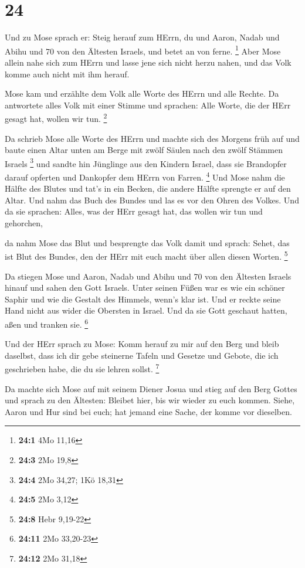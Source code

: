 \hypertarget{section-5}{%
\section{24}\label{section-5}}

 Und zu Mose sprach er: Steig herauf zum HErrn, du und
Aaron, Nadab und Abihu und 70 von den Ältesten Israels, und betet an von
ferne. \footnote{\textbf{24:1} 4Mo 11,16}  Aber Mose allein
nahe sich zum HErrn und lasse jene sich nicht herzu nahen, und das Volk
komme auch nicht mit ihm herauf.

 Mose kam und erzählte dem Volk alle Worte des HErrn und
alle Rechte. Da antwortete alles Volk mit einer Stimme und sprachen:
Alle Worte, die der HErr gesagt hat, wollen wir tun. \footnote{\textbf{24:3}
  2Mo 19,8}

 Da schrieb Mose alle Worte des HErrn und machte sich des
Morgens früh auf und baute einen Altar unten am Berge mit zwölf Säulen
nach den zwölf Stämmen Israels \footnote{\textbf{24:4} 2Mo 34,27; 1Kö
  18,31}  und sandte hin Jünglinge aus den Kindern Israel,
dass sie Brandopfer darauf opferten und Dankopfer dem HErrn von Farren.
\footnote{\textbf{24:5} 2Mo 3,12}  Und Mose nahm die Hälfte
des Blutes und tat's in ein Becken, die andere Hälfte sprengte er auf
den Altar.  Und nahm das Buch des Bundes und las es vor den
Ohren des Volkes. Und da sie sprachen: Alles, was der HErr gesagt hat,
das wollen wir tun und gehorchen,

 da nahm Mose das Blut und besprengte das Volk damit und
sprach: Sehet, das ist Blut des Bundes, den der HErr mit euch macht über
allen diesen Worten. \footnote{\textbf{24:8} Hebr 9,19-22}

 Da stiegen Mose und Aaron, Nadab und Abihu und 70 von den
Ältesten Israels hinauf  und sahen den Gott Israels. Unter
seinen Füßen war es wie ein schöner Saphir und wie die Gestalt des
Himmels, wenn's klar ist.  Und er reckte seine Hand nicht
aus wider die Obersten in Israel. Und da sie Gott geschaut hatten, aßen
und tranken sie. \footnote{\textbf{24:11} 2Mo 33,20-23}

 Und der HErr sprach zu Mose: Komm herauf zu mir auf den
Berg und bleib daselbst, dass ich dir gebe steinerne Tafeln und Gesetze
und Gebote, die ich geschrieben habe, die du sie lehren sollst.
\footnote{\textbf{24:12} 2Mo 31,18}

 Da machte sich Mose auf mit seinem Diener Josua und stieg
auf den Berg Gottes  und sprach zu den Ältesten: Bleibet
hier, bis wir wieder zu euch kommen. Siehe, Aaron und Hur sind bei euch;
hat jemand eine Sache, der komme vor dieselben.

